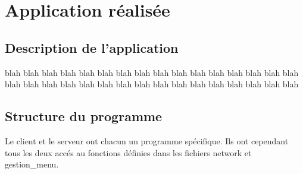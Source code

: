 \chapter{Application réalisée}
\section{Description de l'application}
 blah blah blah blah blah blah blah blah blah blah blah blah blah blah blah blah blah blah blah blah blah blah blah blah blah blah blah blah blah blah blah blah
\section{Structure du programme}
Le client et le serveur ont chacun un programme spécifique. Ils ont cependant tous les deux accés au fonctions définies dans les fichiers network et gestion_menu.


\clearpage

